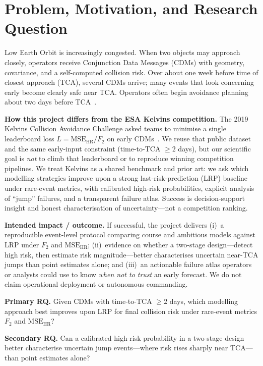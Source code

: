 \documentclass[clean]{bam-proposal}
\begin{document}
\makeproposalheader

\section{Problem, Motivation, and Research Question}

Low Earth Orbit is increasingly congested. When two objects may approach closely, operators receive Conjunction Data Messages (CDMs) with geometry, covariance, and a self-computed collision risk. Over about one week before time of closest approach (TCA), several CDMs arrive; many events that look concerning early become clearly safe near TCA. Operators often begin avoidance planning about two days before TCA~\citep{kelvins2019challenge,uriot2021collision}.

\textbf{How this project differs from the ESA Kelvins competition.}
The 2019 Kelvins Collision Avoidance Challenge asked teams to minimise a single leaderboard loss \(L=\mathrm{MSE}_{\mathrm{HR}}/F_2\) on early CDMs~\citep{kelvins2019challenge,uriot2021collision}. We reuse that public dataset and the same early-input constraint (time-to-TCA \(\ge 2\) days), but our scientific goal is \emph{not} to climb that leaderboard or to reproduce winning competition pipelines. We treat Kelvins as a shared benchmark and prior art: we ask which modelling strategies improve upon a strong last-risk-prediction (LRP) baseline under rare-event metrics, with calibrated high-risk probabilities, explicit analysis of ``jump'' failures, and a transparent failure atlas. Success is decision-support insight and honest characterisation of uncertainty---not a competition ranking.

\textbf{Intended impact / outcome.}
If successful, the project delivers (i)~a reproducible event-level protocol comparing course and ambitious models against LRP under \(F_2\) and \(\mathrm{MSE}_{\mathrm{HR}}\); (ii)~evidence on whether a two-stage design---detect high risk, then estimate risk magnitude---better characterises uncertain near-TCA jumps than point estimates alone; and (iii)~an actionable failure atlas operators or analysts could use to know \emph{when not to trust} an early forecast. We do not claim operational deployment or autonomous commanding.

\textbf{Primary RQ.}
Given CDMs with time-to-TCA \(\ge 2\) days, which modelling approach best improves upon LRP for final collision risk under rare-event metrics \(F_2\) and \(\mathrm{MSE}_{\mathrm{HR}}\)?

\textbf{Secondary RQ.}
Can a calibrated high-risk probability in a two-stage design better characterise uncertain jump events---where risk rises sharply near TCA---than point estimates alone?
\end{document}

